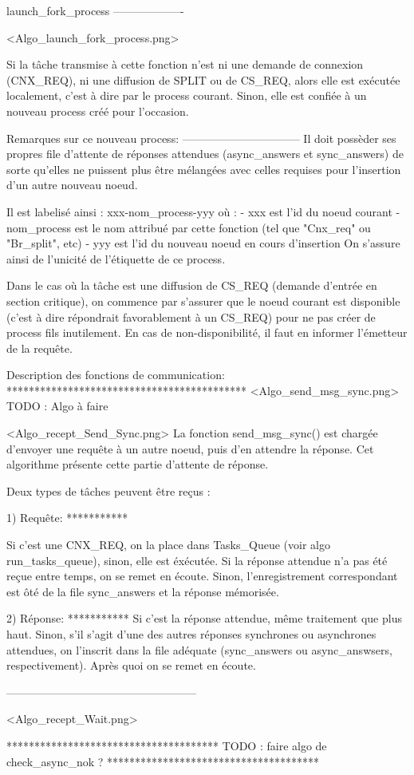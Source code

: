 launch_fork_process
-------------------

<Algo_launch_fork_process.png>

Si la tâche transmise à cette fonction n'est ni une demande de connexion (CNX_REQ), ni une
diffusion de SPLIT ou de CS_REQ, alors elle est exécutée localement, c'est à dire par le process
courant. Sinon, elle est confiée à un nouveau process créé pour l'occasion.

Remarques sur ce nouveau process:
--------------------------------
Il doit possèder ses propres file d'attente de réponses attendues (async_answers et sync_answers)
de sorte qu'elles ne puissent plus être mélangées avec celles requises pour l'insertion d'un autre
nouveau noeud.

Il est labelisé ainsi : xxx-nom_process-yyy où :
  - xxx est l'id du noeud courant
  - nom_process est le nom attribué par cette fonction (tel que "Cnx_req" ou "Br_split", etc)
  - yyy est l'id du nouveau noeud en cours d'insertion
On s'assure ainsi de l'unicité de l'étiquette de ce process.

Dans le cas où la tâche est une diffusion de CS_REQ (demande d'entrée en section critique), on
commence par s'assurer que le noeud courant est disponible (c'est à dire répondrait favorablement à
un CS_REQ) pour ne pas créer de process fils inutilement. En cas de non-disponibilité, il faut en
informer l'émetteur de la requête.

Description des fonctions de communication:
*******************************************
<Algo_send_msg_sync.png>  TODO : Algo à faire 

<Algo_recept_Send_Sync.png>
La fonction send_msg_sync() est chargée d'envoyer une requête à un autre noeud, puis d'en attendre
la réponse.
Cet algorithme présente cette partie d'attente de réponse.

Deux types de tâches peuvent être reçus :

1) Requête:
***********

Si c'est une CNX_REQ, on la place dans Tasks_Queue (voir algo run_tasks_queue), sinon, elle est
éxécutée. Si la réponse attendue n'a pas été reçue entre temps, on se remet en écoute. Sinon,
l'enregistrement correspondant est ôté de la file sync_answers et la réponse mémorisée.

2) Réponse:
***********
Si c'est la réponse attendue, même traitement que plus haut.
Sinon, s'il s'agit d'une des autres réponses synchrones ou asynchrones attendues, on l'inscrit dans
la file adéquate (sync_answers ou async_answsers, respectivement). Après quoi on se remet en écoute.

---------------------------------------------------

<Algo_recept_Wait.png>

**************************************
TODO : faire algo de check_async_nok ?
**************************************
